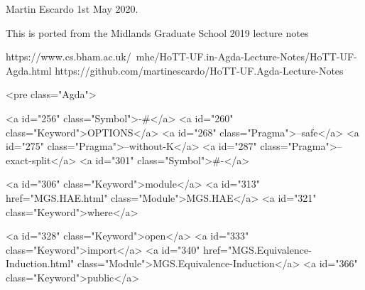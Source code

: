 Martin Escardo 1st May 2020.

This is ported from the Midlands Graduate School 2019 lecture notes

 https://www.cs.bham.ac.uk/~mhe/HoTT-UF.in-Agda-Lecture-Notes/HoTT-UF-Agda.html
 https://github.com/martinescardo/HoTT-UF.Agda-Lecture-Notes

<pre class="Agda">

<a id="256" class="Symbol">{-#</a> <a id="260" class="Keyword">OPTIONS</a> <a id="268" class="Pragma">--safe</a> <a id="275" class="Pragma">--without-K</a> <a id="287" class="Pragma">--exact-split</a> <a id="301" class="Symbol">#-}</a>

<a id="306" class="Keyword">module</a> <a id="313" href="MGS.HAE.html" class="Module">MGS.HAE</a> <a id="321" class="Keyword">where</a>

<a id="328" class="Keyword">open</a> <a id="333" class="Keyword">import</a> <a id="340" href="MGS.Equivalence-Induction.html" class="Module">MGS.Equivalence-Induction</a> <a id="366" class="Keyword">public</a>

